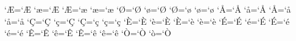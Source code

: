 % 
%
% 
% 
%
%
%
%
% 
\begingroup
\uccode`^^c6=`^^c6
\uccode`^^e6=`^^c6
\lccode`^^c6=`^^e6
\lccode`^^e6=`^^e6
\uccode`^^d8=`^^d8
\uccode`^^f8=`^^d8
\lccode`^^d8=`^^f8
\lccode`^^f8=`^^f8
\uccode`^^c5=`^^c5
\uccode`^^e5=`^^c5
\lccode`^^c5=`^^e5
\lccode`^^e5=`^^e5
\uccode`^^c7=`^^c7
\uccode`^^e7=`^^c7
\lccode`^^c7=`^^e7
\lccode`^^e7=`^^e7
\uccode`^^c8=`^^c8
\uccode`^^e8=`^^c8
\lccode`^^c8=`^^e8
\lccode`^^e8=`^^e8
\uccode`^^c9=`^^c9
\uccode`^^e9=`^^c9
\lccode`^^c9=`^^e9
\lccode`^^e9=`^^e9
\uccode`^^ca=`^^ca
\uccode`^^ea=`^^ca
\lccode`^^ca=`^^ea
\lccode`^^ea=`^^ea
\uccode`^^d2=`^^d2
\uccode`^^f2=`^^d2
